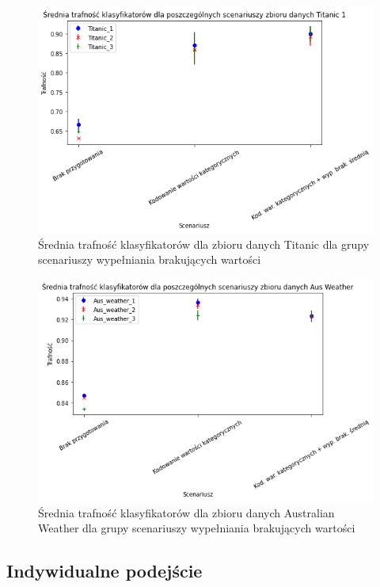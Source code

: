 \documentclass{book}
\begin{document}
\begin{figure}[H]
    \centerline{\includegraphics[scale=0.5]{Titanic_Avg_Kodowanie}}
    \centering
    \caption{Średnia trafność klasyfikatorów dla zbioru danych Titanic 
    dla grupy scenariuszy wypełniania brakujących wartości}
    \end{figure}

\begin{figure}[H]
    \centerline{\includegraphics[scale=0.5]{Aus_Weather_Avg_Kodowanie}}
    \centering
    \caption{Średnia trafność klasyfikatorów dla zbioru danych Australian Weather 
    dla grupy scenariuszy wypełniania brakujących wartości}
    \end{figure}

\subsection{Indywidualne podejście}
\end{document}
